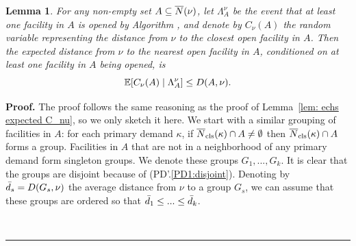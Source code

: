 \documentclass[oneside,final]{ucr}
\newtheorem{lemma}[theorem]{Lemma}
\newenvironment{proof}[1][Proof]{\textbf{#1.} }{\ \rule{0.5em}{0.5em}}
\begin{document}

\begin{lemma}\label{lem: expected distance in EBGS}
  For any non-empty set $A\subseteq {\overline{N}}(\nu)$, let $\Lambda^\nu_A$ be
  the event that at least one facility in $A$ is opened by Algorithm
  {\EBGS}, and denote by $C_\nu(A)$ the random variable representing
  the distance from $\nu$ to the closest open facility in $A$.  Then
  the expected distance from $\nu$ to the nearest open facility in
  $A$, conditioned on at least one facility in $A$ being opened, is
%
\begin{equation*}
	\mathbb{E}[C_\nu(A) \mid \Lambda^\nu_A ] \le D(A,\nu).
\end{equation*}
\end{lemma}

\begin{proof}
  The proof follows the same reasoning as the proof of Lemma~\ref{lem:
    echs expected C_nu}, so we only sketch it here. We start with a
  similar grouping of facilities in $A$: for each primary demand
  $\kappa$, if ${\overline{N}}_{{\mbox{\scriptsize\rm cls}}}(\kappa)\cap A\neq\emptyset$ then
  ${\overline{N}}_{{\mbox{\scriptsize\rm cls}}}(\kappa)\cap A$ forms a group. Facilities in $A$ that are
  not in a neighborhood of any primary demand form singleton groups.
  We denote these groups $G_1,...,G_k$. It is clear that the groups
  are disjoint because of (PD'.\ref{PD1:disjoint}). Denoting by
  ${\bar d}_s = D(G_s, \nu)$ the average distance from $\nu$ to a group $G_s$, we
  can assume that these groups are ordered so that ${\bar d}_1\le ... \le
  {\bar d}_k$.


\end{proof}
\end{document}
